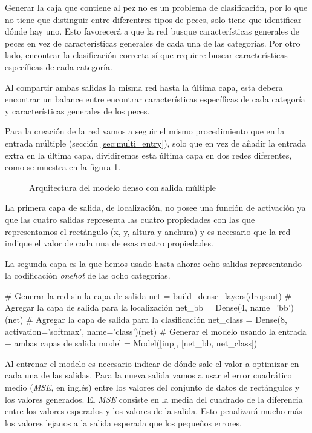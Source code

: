 Generar la caja que contiene al pez no es un problema de clasificación, por lo
que no tiene que distinguir entre diferentres tipos de peces, solo tiene que
identificar dónde hay uno. Esto favorecerá a que la red busque características
generales de peces en vez de características generales de cada una de las
categorías. Por otro lado, encontrar la clasificación correcta sí que requiere
buscar características específicas de cada categoría.

Al compartir ambas salidas la misma red hasta la última capa, esta debera
encontrar un balance entre encontrar características específicas de cada categoría y
características generales de los peces.

Para la creación de la red vamos a seguir el mismo procedimiento que en la
entrada múltiple (sección \ref{sec:multi_entry}), solo que en vez de añadir la
entrada extra en la última capa, dividiremos esta última capa en dos redes
diferentes, como se muestra en la figura \ref{multi_output_arch}.

\begin{figure}
  \caption{Arquitectura del modelo denso con salida múltiple}
\label{multi_output_arch}
\end{figure}


La primera capa de salida, de localización, no posee una función de activación
ya que las cuatro salidas representa las cuatro propiedades con las que
representamos el rectángulo (x, y, altura y anchura) y es necesario que la red
indique el valor de cada una de esas cuatro propiedades.

La segunda capa es la que hemos usado hasta ahora: ocho salidas representando la
codificación \textit{onehot} de las ocho categorías.
\begin{python}
# Generar la red sin la capa de salida 
net = build_dense_layers(dropout)
# Agregar la capa de salida para la localización
net_bb = Dense(4, name='bb')(net)
# Agregar la capa de salida para la clasificación
net_class = Dense(8, activation='softmax', name='class')(net)
# Generar el modelo usando la entrada + ambas capas de salida
model = Model([inp], [net_bb, net_class])
\end{python}

Al entrenar el modelo es necesario indicar de dónde sale el valor a optimizar
en cada una de las salidas. Para la nueva salida vamos a usar el error
cuadrático medio (\textit{MSE}, en inglés) entre los valores del conjunto de
datos de rectángulos y los valores generados. El \textit{MSE} consiste en la
media del cuadrado de la diferencia entre los valores esperados y los valores
de la salida. Esto penalizará mucho más los valores lejanos a la salida
esperada que los pequeños errores.

